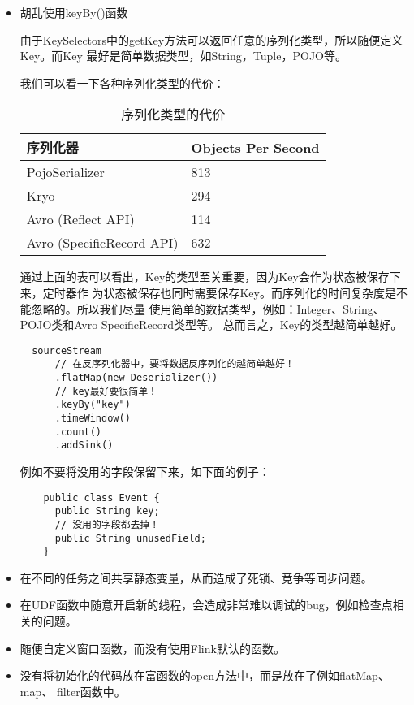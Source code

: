 \documentclass[cn,11pt,chinese]{elegantbook}
\begin{document}
\begin{itemize}
  \begin{lstlisting}
    {
      "name": "atguigu",
      "age": 10
    }

  \end{lstlisting}
  
\item 胡乱使用keyBy()函数

  由于KeySelectors中的getKey方法可以返回任意的序列化类型，所以随便定义Key。而Key
  最好是简单数据类型，如String，Tuple，POJO等。

  我们可以看一下各种序列化类型的代价：

  \begin{table}[htbp!]
    \centering
    \caption{序列化类型的代价}
    \begin{tabular}{ll}
      \toprule
      序列化器 & Objects Per Second \\
      \midrule
      PojoSerializer & 813 \\
      Kryo & 294 \\
      Avro (Reflect API) & 114 \\
      Avro (SpecificRecord API) & 632 \\
      \bottomrule
    \end{tabular}%
  \end{table}%

  通过上面的表可以看出，Key的类型至关重要，因为Key会作为状态被保存下来，定时器作
  为状态被保存也同时需要保存Key。而序列化的时间复杂度是不能忽略的。所以我们尽量
  使用简单的数据类型，例如：Integer、String、POJO类和Avro SpecificRecord类型等。
  总而言之，Key的类型越简单越好。

  \begin{lstlisting}
  sourceStream
      // 在反序列化器中，要将数据反序列化的越简单越好！
      .flatMap(new Deserializer())
      // key最好要很简单！
      .keyBy("key")
      .timeWindow()
      .count()
      .addSink()
  \end{lstlisting}

  例如不要将没用的字段保留下来，如下面的例子：

  \begin{lstlisting}
    public class Event {
      public String key;
      // 没用的字段都去掉！
      public String unusedField;
    } 
  \end{lstlisting}
  
\item 在不同的任务之间共享静态变量，从而造成了死锁、竞争等同步问题。
\item 在UDF函数中随意开启新的线程，会造成非常难以调试的bug，例如检查点相关的问题。
\item 随便自定义窗口函数，而没有使用Flink默认的函数。
\item 没有将初始化的代码放在富函数的open方法中，而是放在了例如flatMap、map、
  filter函数中。
\end{itemize}
\end{document}

